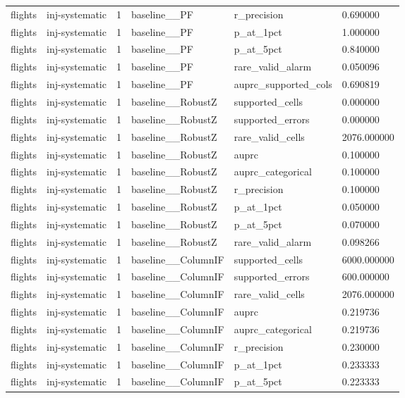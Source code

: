 \begin{tabular}{llllll}
flights & inj-systematic & 1 & baseline\_\_PF & r\_precision & 0.690000 \\
flights & inj-systematic & 1 & baseline\_\_PF & p\_at\_1pct & 1.000000 \\
flights & inj-systematic & 1 & baseline\_\_PF & p\_at\_5pct & 0.840000 \\
flights & inj-systematic & 1 & baseline\_\_PF & rare\_valid\_alarm & 0.050096 \\
flights & inj-systematic & 1 & baseline\_\_PF & auprc\_supported\_cols & 0.690819 \\
flights & inj-systematic & 1 & baseline\_\_RobustZ & supported\_cells & 0.000000 \\
flights & inj-systematic & 1 & baseline\_\_RobustZ & supported\_errors & 0.000000 \\
flights & inj-systematic & 1 & baseline\_\_RobustZ & rare\_valid\_cells & 2076.000000 \\
flights & inj-systematic & 1 & baseline\_\_RobustZ & auprc & 0.100000 \\
flights & inj-systematic & 1 & baseline\_\_RobustZ & auprc\_categorical & 0.100000 \\
flights & inj-systematic & 1 & baseline\_\_RobustZ & r\_precision & 0.100000 \\
flights & inj-systematic & 1 & baseline\_\_RobustZ & p\_at\_1pct & 0.050000 \\
flights & inj-systematic & 1 & baseline\_\_RobustZ & p\_at\_5pct & 0.070000 \\
flights & inj-systematic & 1 & baseline\_\_RobustZ & rare\_valid\_alarm & 0.098266 \\
flights & inj-systematic & 1 & baseline\_\_ColumnIF & supported\_cells & 6000.000000 \\
flights & inj-systematic & 1 & baseline\_\_ColumnIF & supported\_errors & 600.000000 \\
flights & inj-systematic & 1 & baseline\_\_ColumnIF & rare\_valid\_cells & 2076.000000 \\
flights & inj-systematic & 1 & baseline\_\_ColumnIF & auprc & 0.219736 \\
flights & inj-systematic & 1 & baseline\_\_ColumnIF & auprc\_categorical & 0.219736 \\
flights & inj-systematic & 1 & baseline\_\_ColumnIF & r\_precision & 0.230000 \\
flights & inj-systematic & 1 & baseline\_\_ColumnIF & p\_at\_1pct & 0.233333 \\
flights & inj-systematic & 1 & baseline\_\_ColumnIF & p\_at\_5pct & 0.223333 \\

\end{tabular}
